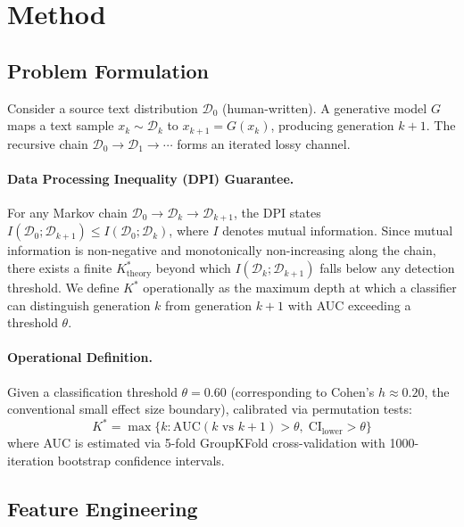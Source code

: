 \documentclass[11pt,a4paper]{article}
\begin{document}
\section{Method}

\subsection{Problem Formulation}

Consider a source text distribution $\mathcal{D}_0$ (human-written). A generative model $G$ maps a text sample $x_k \sim \mathcal{D}_k$ to $x_{k+1} = G(x_k)$, producing generation $k+1$. The recursive chain $\mathcal{D}_0 \to \mathcal{D}_1 \to \cdots$ forms an iterated lossy channel.

\paragraph{Data Processing Inequality (DPI) Guarantee.}
For any Markov chain $\mathcal{D}_0 \to \mathcal{D}_k \to \mathcal{D}_{k+1}$, the DPI states $I(\mathcal{D}_0; \mathcal{D}_{k+1}) \leq I(\mathcal{D}_0; \mathcal{D}_k)$, where $I$ denotes mutual information. Since mutual information is non-negative and monotonically non-increasing along the chain, there exists a finite $K^*_{\text{theory}}$ beyond which $I(\mathcal{D}_{k}; \mathcal{D}_{k+1})$ falls below any detection threshold. We define $K^*$ operationally as the maximum depth at which a classifier can distinguish generation $k$ from generation $k+1$ with AUC exceeding a threshold $\theta$.

\paragraph{Operational Definition.}
Given a classification threshold $\theta = 0.60$ (corresponding to Cohen's $h \approx 0.20$, the conventional small effect size boundary), calibrated via permutation tests:
\begin{equation}
K^* = \max\{k : \text{AUC}(k \text{ vs } k{+}1) > \theta, \; \text{CI}_{\text{lower}} > \theta\}
\end{equation}
where AUC is estimated via 5-fold GroupKFold cross-validation with 1000-iteration bootstrap confidence intervals.

\subsection{Feature Engineering}
\end{document}
